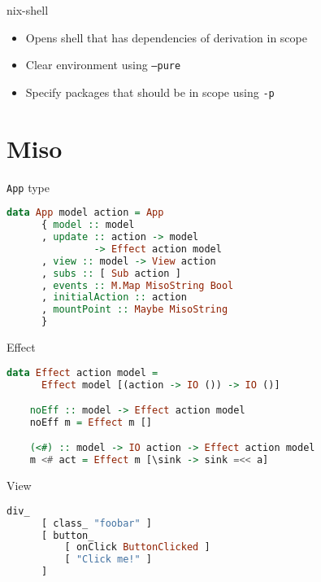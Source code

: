 \documentclass{beamer}
\begin{document}
\begin{frame}{nix-shell}
  \begin{itemize}
  \item Opens shell that has dependencies of derivation in scope
  \item Clear environment using \texttt{--pure}
  \item Specify packages that should be in scope using \texttt{-p}
  \end{itemize}
\end{frame}

\section{Miso}
\begin{frame}[fragile]{\texttt{App} type}
  \begin{lstlisting}[language=Haskell]
    data App model action = App
      { model :: model
      , update :: action -> model
               -> Effect action model
      , view :: model -> View action
      , subs :: [ Sub action ]
      , events :: M.Map MisoString Bool
      , initialAction :: action
      , mountPoint :: Maybe MisoString
      }
  \end{lstlisting}
\end{frame}

\begin{frame}[fragile]{Effect}
  \begin{lstlisting}[language=Haskell]
    data Effect action model =
      Effect model [(action -> IO ()) -> IO ()]

    noEff :: model -> Effect action model
    noEff m = Effect m []

    (<#) :: model -> IO action -> Effect action model
    m <# act = Effect m [\sink -> sink =<< a]
  \end{lstlisting}
\end{frame}

\begin{frame}[fragile]{View}
  \begin{lstlisting}[language=Haskell]
    div_
      [ class_ "foobar" ]
      [ button_
          [ onClick ButtonClicked ]
          [ "Click me!" ]
      ]
  \end{lstlisting}
\end{frame}
\end{document}

